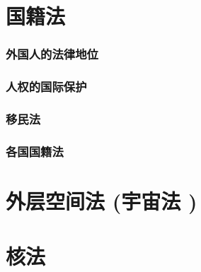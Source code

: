 \documentclass[UTF8]{../ApplicationUniverse}
\begin{document}
\section{国籍法}
    \subsubsection{外国人的法律地位}
    \subsubsection{人权的国际保护}
    \subsubsection{移民法}
    \subsubsection{各国国籍法}

\section{外层空间法 (宇宙法 )}

\section{核法}
\end{document}
